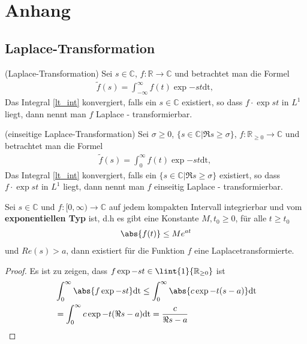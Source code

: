 \appendix %
\chapter{Anhang}
\section{Laplace-Transformation}\label{lt}

\begin{defi}(Laplace-Transformation) Sei $s \in \mathbb{C}$, $f: \mathbb{R} \rightarrow \mathbb{C}$ und betrachtet man die Formel
\begin{align}
	\tilde{f}(s) = \int_{-\infty}^{\infty}{f(t) \exp{-st}} \mathrm{dt} \text{, } \label{lt_int}
\end{align}
Das Integral \ref{lt_int} konvergiert, falls ein $s \in \mathbb{C}$ existiert, so dass $f \cdot \exp{st}$ in $L^1$ liegt, dann nennt man $f$ Laplace - transformierbar. 
\end{defi}
\cite{Polderman1997}
\begin{defi}(einseitige Laplace-Transformation) \label{def:eLT} Sei $\sigma \geq 0$, $\{s \in \mathbb{C}\vert \Re{s} \geq \sigma\}$, $f: \mathbb{R}_{\geq 0} \rightarrow \mathbb{C}$ und betrachtet man die Formel
\begin{align}
	\tilde{f}(s) = \int_{0}^{\infty}{f(t) \exp{-st}} \mathrm{dt} \text{, } \label{lt_int}
\end{align}
Das Integral \ref{lt_int} konvergiert, falls ein $\{s \in \mathbb{C}\vert \Re{s} \geq \sigma\}$ existiert, so dass $f \cdot \exp{st}$ in $L^1$ liegt, dann nennt man $f$ einseitig Laplace - transformierbar. 
\end{defi}
\cite{Polderman1997}
\begin{satz}\label{s:expTyp}
	Sei $s \in \mathbb{C}$ und $f:[0, \infty) \rightarrow \mathbb{C}$ auf jedem kompakten Intervall integrierbar und vom \textbf{exponentiellen Typ} ist, d.h es gibt eine Konstante $M, t_0 \geq 0$, für alle $t \geq t_0$ 
	\begin{align}
		\abs{f(t)} \leq M e^{at}
	\end{align}
	und $Re(s) > a$, 
	dann existiert für die Funktion $f$ eine Laplacetransformierte.
	\begin{proof}
	Es ist zu zeigen, dass $f\exp{-st} \in \lint{1}{\mathbb{R}_{\geq 0}}$ ist
	\begin{align}
		&\int_0^{\infty} \abs{f\exp{-st}} \mathrm{dt} \leq \int_0^{\infty} \abs{c\exp{-t(s-a)}} \mathrm{dt} \\
		&=  \int_0^{\infty} {c\exp{-t(\Re{s}-a)}} \mathrm{dt} = \frac{c}{\Re{s}-a}
	\end{align}
	\end{proof}
\end{satz}
